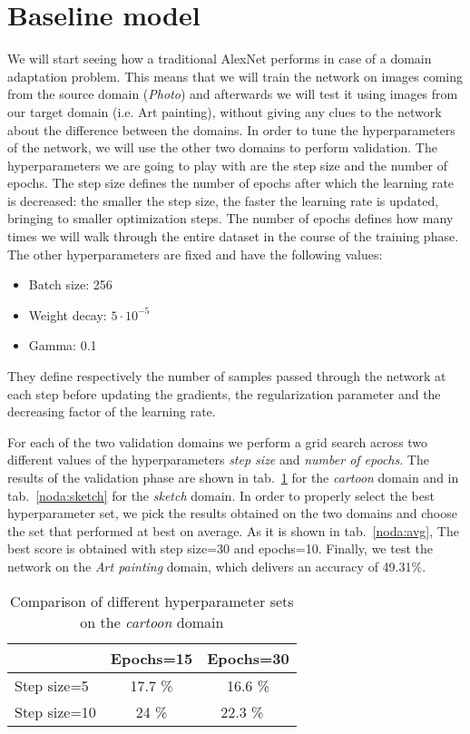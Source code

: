 \documentclass[11pt,twoside,a4paper]{article}
\begin{document}
\section{Baseline model}
\label{base}
We will start seeing how a traditional AlexNet performs in case of a domain adaptation problem. This means that we will train the network on images coming from the source domain (\textit{Photo}) and afterwards we will test it using images from our target domain (i.e. {Art painting}), without giving any clues to the network about the difference between the domains. In order to tune the hyperparameters of the network, we will use the other two domains to perform validation.\newline
The hyperparameters we are going to play with are the step size and the number of epochs. The step size defines the number of epochs after which the learning rate is decreased: the smaller the step size, the faster the learning rate is updated, bringing to smaller optimization steps. The number of epochs defines how many times we will walk through the entire dataset in the course of the training phase. The other hyperparameters are fixed and have the following values:
\begin{itemize}
\item Batch size: 256
\item Weight decay: $5\cdot10^{-5}$
\item Gamma: 0.1
\end{itemize}
They define respectively the number of samples passed through the network at each step before updating the gradients, the regularization parameter and the decreasing factor of the learning rate.

For each of the two validation domains we perform a grid search across two different values of the hyperparameters \textit{step size} and \textit{number of epochs}. The results of the validation phase are shown in tab.~\ref{noda:cartoon} for the \textit{cartoon} domain and in tab.~\ref{noda:sketch} for the \textit{sketch} domain.\newline
In order to properly select the best hyperparameter set, we pick the results obtained on the two domains and choose the set that performed at best on average. As it is shown in tab.~\ref{noda:avg}, The best score is obtained with step size=30 and epochs=10. Finally, we test the network on the \textit{Art painting} domain, which delivers an accuracy of 49.31\%.

\begin{table}[!h]
  \begin{adjustwidth}{-.5in}{-.5in}
  \begin{center}
    \begin{tabular}{l | c | c}
        & Epochs=15 & Epochs=30 \\
      \hline
	Step size=5 & 17.7 \% & 16.6 \% \\
	Step size=10 & 24 \% & 22.3 \% \
    \end{tabular}
    \caption{Comparison of different hyperparameter sets on the \textit{cartoon} domain}
    \label{noda:cartoon}
  \end{center}
  \end{adjustwidth}
\end{table}
\end{document}
